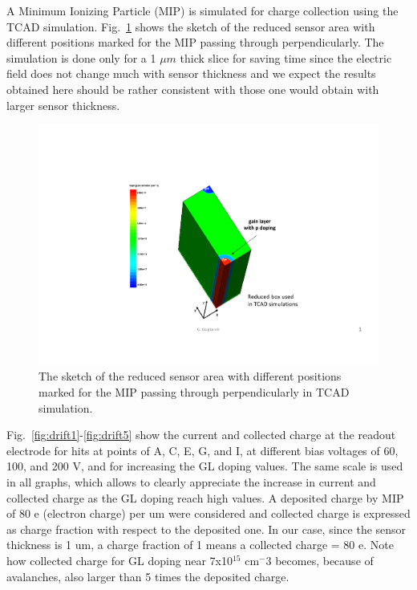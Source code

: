 \documentclass[aps,pt14,superscriptaddress,showpacs,floatfix,nofootinbib]{revtex4}
\begin{document}
A Minimum Ionizing Particle (MIP) is simulated for charge collection using the TCAD simulation. Fig.~\ref{fig:box_points}
shows the sketch of the reduced sensor area with different positions marked for the MIP passing through perpendicularly. 
The simulation is done only for a 1 $\mu m$ thick slice for saving time since the electric field does not change much 
with sensor thickness and we expect the results obtained here should be rather consistent with those one would obtain with 
larger sensor thickness.

\begin{figure}[hbtp]
\begin{center}
\includegraphics[page=5,width=0.6\textheight,keepaspectratio]{figures/IBL-3DwithGainLayer_20190610_toWeiming.pdf}
\caption{The sketch of the reduced sensor area with different positions marked for the MIP passing through perpendicularly
in TCAD simulation.\label{fig:box_points}}
\end{center}
\end{figure}
 
Fig.~\ref{fig:drift1}-\ref{fig:drift5} show the current and collected charge at the readout electrode for 
hits at points of A, C, E, G, and I, at different bias voltages of 60, 100, and 200 V, and for increasing 
the GL doping values. The same scale is used in
all graphs, which allows to clearly appreciate the increase in current
and collected charge as the GL doping reach high values. A deposited
charge by MIP of 80 e (electron charge) per um were considered and
collected charge is expressed as charge fraction with respect to the
deposited one. In our case, since the sensor thickness is 1 um, a charge
fraction of 1 means a collected charge = 80 e. Note how collected charge
for GL doping near 7x10$^15$ cm$^-3$ becomes, because of avalanches, also
larger than 5 times the deposited charge.
\end{document}
